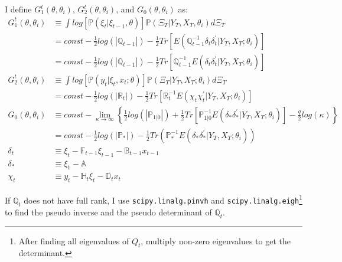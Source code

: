 \documentclass[10pt, titlepage]{article}
\numberwithin{equation}{section}
\begin{document}
I define $G_1^{t}(\theta,\theta_i)$, $G_2^{t}(\theta,\theta_i)$, and $G_0(\theta,\theta_i)$ as:
\begin{align}
    G_1^{t}(\theta,\theta_{i}) &\equiv \int log[\mathbb{P}(\xi_t|\xi_{t-1},\theta)]\mathbb{P}(\Xi_T|Y_T,X_T,\theta_{i})d\Xi_T \nonumber \\
    &= const -\frac{1}{2}log(|\mathbb{Q}_{t-1}|)-\frac{1}{2}Tr[E(\mathbb{Q}_{t-1}^{-1}\delta_t\delta_t^{'}|Y_T,X_T;\theta_{i})] \nonumber \\
    &= const - \frac{1}{2}log(|\mathbb{Q}_{t-1}|) - \frac{1}{2}Tr[\mathbb{Q}_{t-1}^{-1}E(\delta_t\delta_t^{'}|Y_T,X_T;\theta_{i})] \label{eq:log1_trace} \\
    G_2^t(\theta,\theta_{i}) &\equiv \int log[\mathbb{P}(y_t|\xi_{t},x_t; \theta)]\mathbb{P}(\Xi_T|Y_T,X_T;\theta_{i})d\Xi_T \nonumber \\
    &= const - \frac{1}{2}log(|\mathbb{R}_t|)-\frac{1}{2}Tr[\mathbb{R}_t^{-1}E(\chi_t\chi_t^{'}|Y_T,X_T;\theta_{i})] \label{eq:log2_trace} \\
    G_0(\theta,\theta_{i}) &\equiv const - \lim_{\kappa\rightarrow\infty}\left\{\frac{1}{2}log(|\mathbb{P}_{1|0}|) + \frac{1}{2}Tr[\mathbb{P}_{1|0}^{-1}E(\delta_*\delta_*^{'}|Y_T, X_T; \theta_{i})] - \frac{q}{2}log(\kappa)\right\} \nonumber \\
    &=const - \frac{1}{2}log(|\mathbb{P}_*|)-\frac{1}{2}Tr(\mathbb{P}_*^{-1}E(\delta_*\delta_*^{'}|Y_T, X_T; \theta_{i})) \\
    \delta_t &\equiv \xi_t - \mathbb{F}_{t-1}\xi_{t-1} - \mathbb{B}_{t-1}x_{t-1} \nonumber \\
    \delta_* &\equiv \xi_1 - \mathbb{A} \nonumber \\
    \chi_t &\equiv y_t - \mathbb{H}_t\xi_t - \mathbb{D}_tx_t \nonumber
\end{align}

If $\mathbb{Q}_t$ does not have full rank, I use \texttt{scipy.linalg.pinvh} and \texttt{scipy.linalg.eigh}\footnote{After finding all eigenvalues of $Q_t$, multiply non-zero eigenvalues to get the determinant.} to find the pseudo inverse and the pseudo determinant of $\mathbb{Q}_t$.
\end{document}
